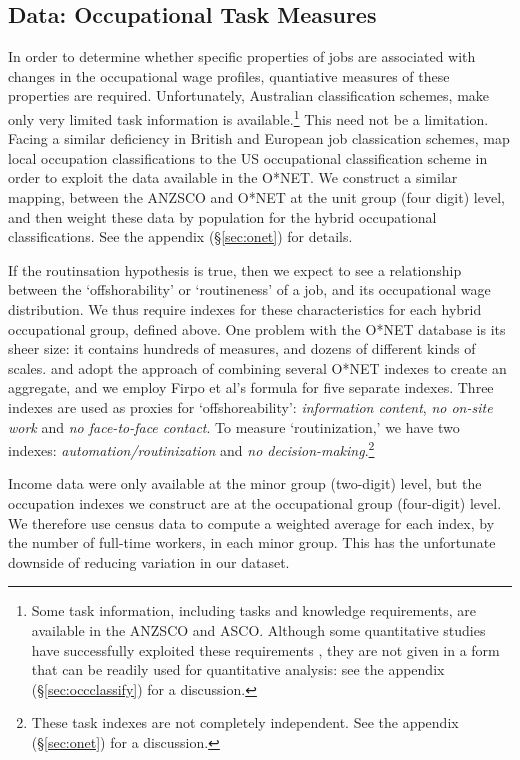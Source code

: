 \subsection{Data: Occupational Task Measures}

In order to determine whether specific properties of jobs are associated with changes in the occupational wage profiles, quantiative measures of these properties are required. Unfortunately, Australian classification schemes, make only very limited task information is available.\footnote{Some task information, including tasks and knowledge requirements, are available in the ANZSCO and ASCO. Although some quantitative studies have successfully exploited these requirements \citep[e.g.]{Barnes2002}, they are not given in a form that can be readily used for quantitative analysis: see the appendix (\S\ref{sec:occclassify}) for a discussion.} This need not be a limitation. Facing a similar deficiency in British and European job classication schemes, \citet{Goos2009} map local occupation classifications to the US occupational classification scheme in order to exploit the data available in the O*NET. We construct a similar mapping, between the ANZSCO and O*NET at the unit group (four digit) level, and then weight these data by population for the hybrid occupational classifications. See the appendix (\S\ref{sec:onet}) for details.

If the routinsation hypothesis is true, then we expect to see a relationship between the `offshorability' or `routineness' of a job, and its occupational wage distribution. We thus require indexes for these characteristics for each hybrid occupational group, defined above. One problem with the O*NET database is its sheer size: it contains hundreds of measures, and dozens of different kinds of scales. \citet{Jensen2010} and \citet{Firpo2011} adopt the approach of combining several O*NET indexes to create an aggregate, and we employ Firpo et al's formula for five separate indexes. Three indexes are used as proxies for `offshoreability': {\em information content}, {\em no on-site work} and {\em no face-to-face contact}. To measure `routinization,' we have two indexes: {\em automation/routinization} and {\em no decision-making}.\footnote{These task indexes are not completely independent. See the appendix (\S\ref{sec:onet}) for a discussion.}

Income data were only available at the minor group (two-digit) level, but the occupation indexes we construct are at the occupational group (four-digit) level. We therefore use census data to compute a weighted average for each index, by the number of full-time workers, in each minor group. This has the unfortunate downside of reducing variation in our dataset. %

